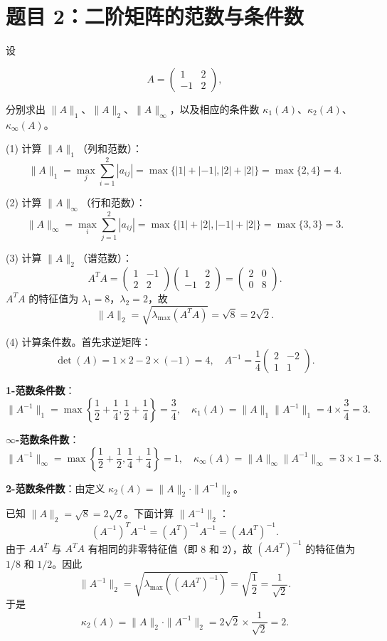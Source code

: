 \documentclass{article}
\begin{document}
\section{题目 2：二阶矩阵的范数与条件数}

设

\[
  A =
  \begin{pmatrix}
    1 & 2 \\
    -1 & 2
  \end{pmatrix},
\]

分别求出 $\|A\|_1$、$\|A\|_2$、$\|A\|_\infty$，以及相应的条件数
$\kappa_1(A)$、$\kappa_2(A)$、$\kappa_\infty(A)$。

\begin{solution}
  (1) 计算 $\|A\|_1$（列和范数）：
  \[
    \|A\|_1 = \max_{j} \sum_{i=1}^{2} |a_{ij}| = \max\{|1|+|-1|,
    |2|+|2|\} = \max\{2, 4\} = 4.
  \]

  (2) 计算 $\|A\|_\infty$（行和范数）：
  \[
    \|A\|_\infty = \max_{i} \sum_{j=1}^{2} |a_{ij}| = \max\{|1|+|2|,
    |-1|+|2|\} = \max\{3, 3\} = 3.
  \]

  (3) 计算 $\|A\|_2$（谱范数）：
  \[
    A^TA =
    \begin{pmatrix} 1 & -1 \\ 2 & 2
    \end{pmatrix}
    \begin{pmatrix} 1 & 2 \\ -1 & 2
    \end{pmatrix}
    =
    \begin{pmatrix} 2 & 0 \\ 0 & 8
    \end{pmatrix}.
  \]
  $A^TA$ 的特征值为 $\lambda_1 = 8$，$\lambda_2 = 2$，故
  \[
    \|A\|_2 = \sqrt{\lambda_{\max}(A^TA)} = \sqrt{8} = 2\sqrt{2}.
  \]

  (4) 计算条件数。首先求逆矩阵：
  \[
    \det(A) = 1 \times 2 - 2 \times (-1) = 4, \quad
    A^{-1} = \frac{1}{4}
    \begin{pmatrix} 2 & -2 \\ 1 & 1
    \end{pmatrix}.
  \]

  \textbf{1-范数条件数}：
  \[
    \|A^{-1}\|_1 = \max\left\{\frac{1}{2}+\frac{1}{4},
    \frac{1}{2}+\frac{1}{4}\right\} = \frac{3}{4},
    \quad \kappa_1(A) = \|A\|_1 \|A^{-1}\|_1 = 4 \times \frac{3}{4} = 3.
  \]

  \textbf{$\infty$-范数条件数}：
  \[
    \|A^{-1}\|_\infty = \max\left\{\frac{1}{2}+\frac{1}{2},
    \frac{1}{4}+\frac{1}{4}\right\} = 1,
    \quad \kappa_\infty(A) = \|A\|_\infty \|A^{-1}\|_\infty = 3 \times 1 = 3.
  \]

  \textbf{2-范数条件数}：由定义 $\kappa_2(A) = \|A\|_2 \cdot \|A^{-1}\|_2$。

  已知 $\|A\|_2 = \sqrt{8} = 2\sqrt{2}$。下面计算 $\|A^{-1}\|_2$：
  \[
    (A^{-1})^T A^{-1} = (A^T)^{-1} A^{-1} = (AA^T)^{-1}.
  \]
  由于 $AA^T$ 与 $A^TA$ 有相同的非零特征值（即 8 和 2），故 $(AA^T)^{-1}$ 的特征值为 $1/8$ 和 $1/2$。因此
  \[
    \|A^{-1}\|_2 = \sqrt{\lambda_{\max}((AA^T)^{-1})} =
    \sqrt{\frac{1}{2}} = \frac{1}{\sqrt{2}}.
  \]
  于是
  \[
    \kappa_2(A) = \|A\|_2 \cdot \|A^{-1}\|_2 = 2\sqrt{2} \times
    \frac{1}{\sqrt{2}} = 2.
  \]
\end{solution}
\end{document}
